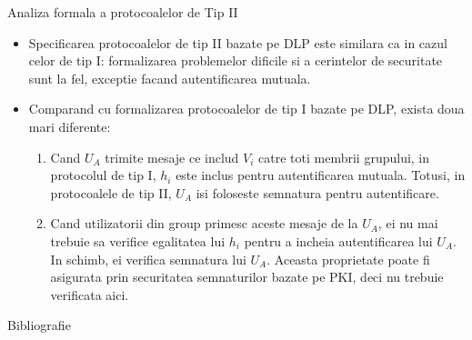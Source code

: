 \documentclass[11pt]{beamer}
\begin{document}
\begin{frame}[allowframebreaks]{Analiza formala a protocoalelor de Tip II}

\begin{itemize}

\item Specificarea protocoalelor de tip II bazate pe DLP este similara ca in cazul celor de tip I: formalizarea problemelor dificile si a cerintelor de securitate sunt la fel, exceptie facand autentificarea mutuala.

\item Comparand cu formalizarea protocoalelor de tip I bazate pe DLP, exista doua mari diferente:
	
	\begin{enumerate}
	
	\item Cand $U_A$ trimite mesaje ce includ $V_i$ catre toti membrii grupului, in protocolul de tip I, $h_i$ este inclus pentru autentificarea mutuala. Totusi, in protocoalele de tip II, $U_A$ isi foloseste semnatura pentru autentificare.
	
	\item Cand utilizatorii din group primesc aceste mesaje de la $U_A$, ei nu mai trebuie sa verifice egalitatea lui $h_i$ pentru a incheia autentificarea lui $U_A$. In schimb, ei verifica semnatura lui $U_A$. Aceasta proprietate poate fi asigurata prin securitatea semnaturilor bazate pe PKI, deci nu trebuie verificata aici.
	
	\end{enumerate}

\end{itemize}

\end{frame}

\begin{frame}{Bibliografie}
\printbibliography
\end{frame}
\end{document}
